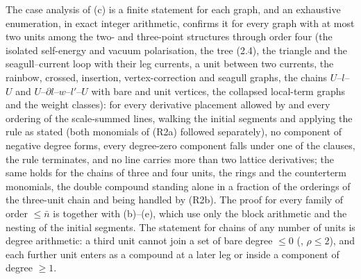 \begin{remark}\label{rot:h1s:census}
The case analysis of (c) is a finite statement for each graph, and an exhaustive enumeration, in exact integer arithmetic, confirms it for every graph with at most two units among the two- and three-point structures through order four (the isolated self-energy and vacuum polarisation, the tree (2.4), the triangle and the seagull--current loop with their leg currents, a unit between two currents, the rainbow, crossed, insertion, vertex-correction and seagull graphs, the chains $U$--$l$--$U$ and $U$--$\partial l$--$w$--$l'$--$U$ with bare and unit vertices, the collapsed local-term graphs and the weight classes): for every derivative placement allowed by  and every ordering of the scale-summed lines, walking the initial segments and applying the rule as stated (both monomials of (R2a) followed separately), no component of negative degree forms, every degree-zero component falls under one of the clauses, the rule terminates, and no line carries more than two lattice derivatives; the same holds for the chains of three and four units, the rings and the counterterm monomials, the double compound standing alone in a fraction of the orderings of the three-unit chain and being handled by (R2b). The proof for every family of order $\le\bar n$ is  together with (b)--(e), which use only the block arithmetic and the nesting of the initial segments. The statement for chains of any number of units is degree arithmetic: a third unit cannot join a set of bare degree $\le0$ (, $\rho\le2$), and each further unit enters as a compound at a later leg or inside a component of degree $\ge1$.
\end{remark}
